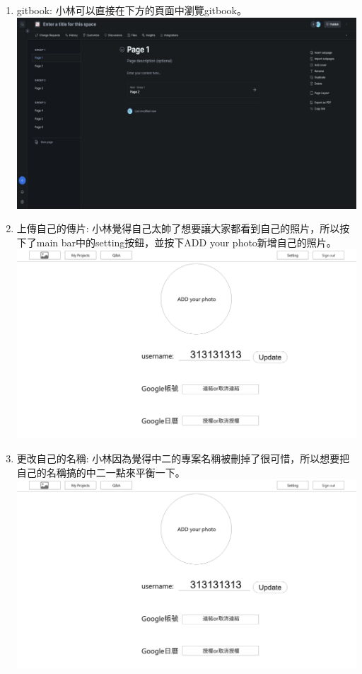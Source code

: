 \documentclass{report}
\begin{document}
\begin{enumerate}[label=(\Alph*)]
  \item gitbook: 小林可以直接在下方的頁面中瀏覽gitbook。 \\
  \includegraphics[width=\textwidth]{assets/wireframe/gitbook.png}
  \item 上傳自己的傳片: 小林覺得自己太帥了想要讓大家都看到自己的照片，所以按下了main bar中的setting按鈕，並按下ADD your photo新增自己的照片。\\
  \includegraphics[width=\textwidth]{assets/wireframe/setting.png}
  \item 更改自己的名稱: 小林因為覺得中二的專案名稱被刪掉了很可惜，所以想要把自己的名稱搞的中二一點來平衡一下。\\
  \includegraphics[width=\textwidth]{assets/wireframe/setting.png}

\end{enumerate}
\end{document}

